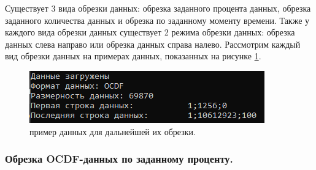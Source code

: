 {\standartFont

  \par Существует 3 вида обрезки данных: обрезка заданного процента данных, обрезка заданного количества данных и обрезка по заданному моменту времени. Также у каждого вида обрезки данных существует 2 режима обрезки данных: обрезка данных слева направо или обрезка данных справа налево. Рассмотрим каждый вид обрезки данных на примерах данных, показанных на рисунке \ref{fig:ExOCDFdataForCating}. 

  \begin{figure}[H]
    \centering
    \includegraphics{images/forDataManipulator/ExOCDFdataForCating.png}
    \caption{пример данных для дальнейшей их обрезки.} 
    \label{fig:ExOCDFdataForCating}
  \end{figure}

  \par
}

\subsubsection{ \standartTitleFont
  Обрезка OCDF-данных по заданному проценту. 
} \label{subsubsec:OCDFCutPer}

